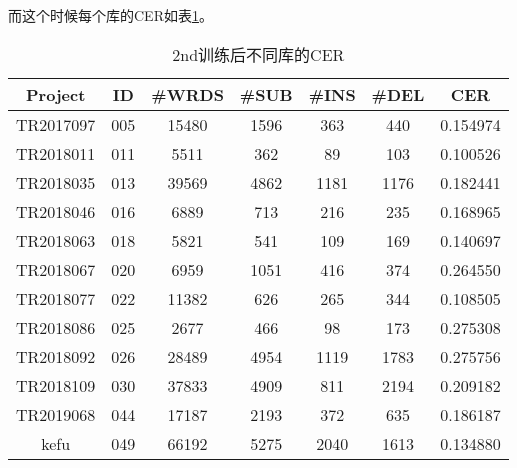 而这个时候每个库的CER如表\ref{tab:second-each}。
\begin{table}[h]
 \centering
 \caption{2nd训练后不同库的CER}
	 \begin{tabular*}{1\textwidth}{@{\extracolsep{\fill}}ccccccc}
	 \toprule
		{\bf Project   } & {\bf ID   } & {\bf #WRDS   } & {\bf #SUB    } & {\bf #INS    } & {\bf #DEL    } & {\bf CER  } \\
	 \midrule
		TR2017097 &	005  &	15480   &	1596  &  	363    & 	440   &  	0.154974 \\
		TR2018011 &	011  &	5511    &	362   &  	89     & 	103   &  	0.100526 \\
		TR2018035 &	013  &	39569   &	4862  &  	1181   & 	1176  &  	0.182441 \\
		TR2018046 &	016  &	6889    &	713   &  	216    & 	235   &  	0.168965 \\
		TR2018063 &	018  &	5821    &	541   &  	109    & 	169   &  	0.140697 \\
		TR2018067 &	020  &	6959    &	1051  &  	416    & 	374   &  	0.264550 \\
		TR2018077 &	022  &	11382   &	626   &  	265    & 	344   &  	0.108505 \\
		TR2018086 &	025  &	2677    &	466   &  	98     & 	173   &  	0.275308 \\
		TR2018092 &	026  &	28489   &	4954  &  	1119   & 	1783  &  	0.275756 \\
		TR2018109 &	030  &	37833   &	4909  &  	811    & 	2194  &  	0.209182 \\
		TR2019068 &	044  &	17187   &	2193  &  	372    & 	635   &  	0.186187 \\
		kefu      &	049  &	66192   &	5275  &  	2040   & 	1613  &  	0.134880 \\
	 \bottomrule
	 \end{tabular*}%
 \label{tab:second-each}%
\end{table}%

